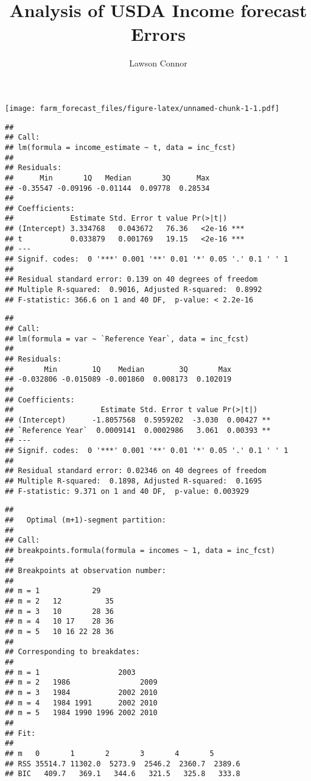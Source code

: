 \documentclass[]{article}
\title{Analysis of USDA Income forecast Errors}
\author{Lawson Connor}
\date{}
\begin{document}
\maketitle

\texttt{[image: farm\_forecast\_files/figure-latex/unnamed-chunk-1-1.pdf]}

\begin{verbatim}
## 
## Call:
## lm(formula = income_estimate ~ t, data = inc_fcst)
## 
## Residuals:
##      Min       1Q   Median       3Q      Max 
## -0.35547 -0.09196 -0.01144  0.09778  0.28534 
## 
## Coefficients:
##             Estimate Std. Error t value Pr(>|t|)    
## (Intercept) 3.334768   0.043672   76.36   <2e-16 ***
## t           0.033879   0.001769   19.15   <2e-16 ***
## ---
## Signif. codes:  0 '***' 0.001 '**' 0.01 '*' 0.05 '.' 0.1 ' ' 1
## 
## Residual standard error: 0.139 on 40 degrees of freedom
## Multiple R-squared:  0.9016, Adjusted R-squared:  0.8992 
## F-statistic: 366.6 on 1 and 40 DF,  p-value: < 2.2e-16
\end{verbatim}

\begin{verbatim}
## 
## Call:
## lm(formula = var ~ `Reference Year`, data = inc_fcst)
## 
## Residuals:
##       Min        1Q    Median        3Q       Max 
## -0.032806 -0.015089 -0.001860  0.008173  0.102019 
## 
## Coefficients:
##                    Estimate Std. Error t value Pr(>|t|)   
## (Intercept)      -1.8057568  0.5959202  -3.030  0.00427 **
## `Reference Year`  0.0009141  0.0002986   3.061  0.00393 **
## ---
## Signif. codes:  0 '***' 0.001 '**' 0.01 '*' 0.05 '.' 0.1 ' ' 1
## 
## Residual standard error: 0.02346 on 40 degrees of freedom
## Multiple R-squared:  0.1898, Adjusted R-squared:  0.1695 
## F-statistic: 9.371 on 1 and 40 DF,  p-value: 0.003929
\end{verbatim}

\begin{verbatim}
## 
##   Optimal (m+1)-segment partition: 
## 
## Call:
## breakpoints.formula(formula = incomes ~ 1, data = inc_fcst)
## 
## Breakpoints at observation number:
##                       
## m = 1            29   
## m = 2   12          35
## m = 3   10       28 36
## m = 4   10 17    28 36
## m = 5   10 16 22 28 36
## 
## Corresponding to breakdates:
##                                 
## m = 1                  2003     
## m = 2   1986                2009
## m = 3   1984           2002 2010
## m = 4   1984 1991      2002 2010
## m = 5   1984 1990 1996 2002 2010
## 
## Fit:
##                                                    
## m   0       1       2       3       4       5      
## RSS 35514.7 11302.0  5273.9  2546.2  2360.7  2389.6
## BIC   409.7   369.1   344.6   321.5   325.8   333.8
\end{verbatim}
\end{document}
